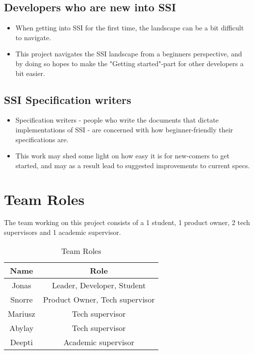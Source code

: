 \subsection{Developers who are new into SSI}
\begin{itemize}
\item When getting into SSI for the first time, the landscape can be a bit difficult to navigate.
\item This project navigates the SSI landscape from a beginners perspective, and by doing so hopes to make the "Getting started"-part for other developers a bit easier.
\end{itemize}

\subsection{SSI Specification writers}
\begin{itemize}
\item Specification writers - people who write the documents that dictate implementations of SSI - are concerned with how beginner-friendly their specifications are.
\item This work may shed some light on how easy it is for new-comers to get started, and may as a result lead to suggested improvements to current specs.
\end{itemize}



\section{Team Roles}

The team working on this project consists of a 1 student, 1 product owner, 2 tech supervisors and 1 academic supervisor.

\begin{table}
  \centering
  \caption{Team Roles}
  \label{tab:example1}
  \begin{tabular}{cc}
    \hline
    Name  & Role \\
    \hline
    Jonas       & Leader, Developer, Student         \\
    Snorre      & Product Owner, Tech supervisor \\
    Mariusz     & Tech supervisor \\
    Abylay      & Tech supervisor \\
    Deepti      & Academic supervisor \\
    \hline
  \end{tabular}
\end{table}


